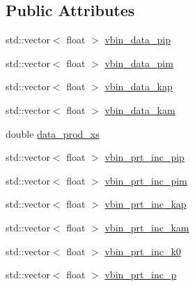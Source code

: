 \subsection*{Public Attributes}
\begin{DoxyCompactItemize}
\item 
std\-::vector$<$ float $>$ \hyperlink{class_neutrino_flux_reweight_1_1_thin_targetnucleon_a_reweighter_ae7012b962ce5fc1297fe56722661532a}{vbin\-\_\-data\-\_\-pip}
\item 
std\-::vector$<$ float $>$ \hyperlink{class_neutrino_flux_reweight_1_1_thin_targetnucleon_a_reweighter_ae0b6c63ce05db44c64d8b272ce3cbaed}{vbin\-\_\-data\-\_\-pim}
\item 
std\-::vector$<$ float $>$ \hyperlink{class_neutrino_flux_reweight_1_1_thin_targetnucleon_a_reweighter_acfadbda1695d49d43efe9e5a5395317b}{vbin\-\_\-data\-\_\-kap}
\item 
std\-::vector$<$ float $>$ \hyperlink{class_neutrino_flux_reweight_1_1_thin_targetnucleon_a_reweighter_ae434ebe9822621ab7e5250b4057a883d}{vbin\-\_\-data\-\_\-kam}
\item 
double \hyperlink{class_neutrino_flux_reweight_1_1_thin_targetnucleon_a_reweighter_a47e99efcf073246a61f4a5bd4db3574e}{data\-\_\-prod\-\_\-xs}
\item 
std\-::vector$<$ float $>$ \hyperlink{class_neutrino_flux_reweight_1_1_thin_targetnucleon_a_reweighter_a62d37535ba63cd757dcf40763a66d459}{vbin\-\_\-prt\-\_\-inc\-\_\-pip}
\item 
std\-::vector$<$ float $>$ \hyperlink{class_neutrino_flux_reweight_1_1_thin_targetnucleon_a_reweighter_ae1652fcc9e3b525b169b0bcb8bf22a1c}{vbin\-\_\-prt\-\_\-inc\-\_\-pim}
\item 
std\-::vector$<$ float $>$ \hyperlink{class_neutrino_flux_reweight_1_1_thin_targetnucleon_a_reweighter_a82e5925cc95dfa54adbb6b0f5af89444}{vbin\-\_\-prt\-\_\-inc\-\_\-kap}
\item 
std\-::vector$<$ float $>$ \hyperlink{class_neutrino_flux_reweight_1_1_thin_targetnucleon_a_reweighter_a846d581016c8e15e5528c64fdc5a6fee}{vbin\-\_\-prt\-\_\-inc\-\_\-kam}
\item 
std\-::vector$<$ float $>$ \hyperlink{class_neutrino_flux_reweight_1_1_thin_targetnucleon_a_reweighter_abc9e0de56770183d6108172ae1673b6d}{vbin\-\_\-prt\-\_\-inc\-\_\-k0}
\item 
std\-::vector$<$ float $>$ \hyperlink{class_neutrino_flux_reweight_1_1_thin_targetnucleon_a_reweighter_a7ac18fafe93466aae51c87b6a11eea35}{vbin\-\_\-prt\-\_\-inc\-\_\-p}
\item 

\end{DoxyCompactItemize}
